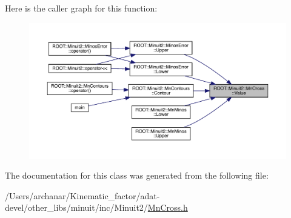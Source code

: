 Here is the caller graph for this function\+:
\nopagebreak
\begin{figure}[H]
\begin{center}
\leavevmode
\includegraphics[width=350pt]{d3/db2/classROOT_1_1Minuit2_1_1MnCross_af7cebab3edb3fedaf0e4ce0704e1196f_icgraph}
\end{center}
\end{figure}


The documentation for this class was generated from the following file\+:\begin{DoxyCompactItemize}
\item 
/\+Users/archanar/\+Kinematic\+\_\+factor/adat-\/devel/other\+\_\+libs/minuit/inc/\+Minuit2/\mbox{\hyperlink{adat-devel_2other__libs_2minuit_2inc_2Minuit2_2MnCross_8h}{Mn\+Cross.\+h}}\end{DoxyCompactItemize}
